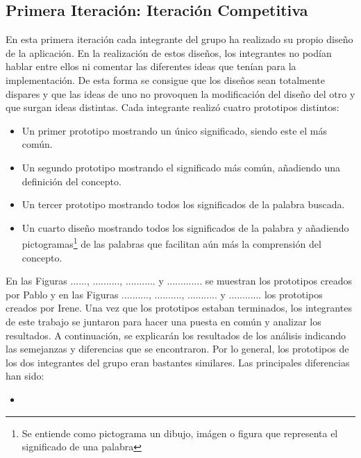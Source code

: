\subsection{Primera Iteración: Iteración Competitiva}
\label{cap:subsec:iteracionCompetitiva}

En esta primera iteración cada integrante del grupo ha realizado su propio diseño de la aplicación. En la realización de estos diseños, los integrantes no podían hablar entre ellos ni comentar las diferentes ideas que tenían para la implementación. De esta forma se consigue que los diseños sean totalmente dispares y que las ideas de uno no provoquen la modificación del diseño del otro y que surgan ideas distintas.
Cada integrante realizó cuatro prototipos distintos:
\begin{itemize}
	\item Un primer prototipo mostrando un único significado, siendo este el más común.
	\item Un segundo prototipo mostrando el significado más común, añadiendo una definición del concepto.
	\item Un tercer prototipo mostrando todos los significados de la palabra buscada.
	\item Un cuarto diseño mostrando todos los significados de la palabra y añadiendo pictogramas\footnote{Se entiende como pictograma un dibujo, imágen o figura que representa el significado de una palabra} de las palabras que facilitan aún más la comprensión del concepto.
	
\end{itemize}

En las Figuras ......, .........., ........... y ............. se muestran los prototipos creados por Pablo y en las Figuras .........., .........., ........... y ............ los prototipos creados por Irene.
Una vez que los prototipos estaban terminados, los integrantes de este trabajo se juntaron para hacer una puesta en común y analizar los resultados. A continuación, se explicarán los resultados de los análisis indicando las semejanzas y diferencias que se encontraron.
Por lo general, los prototipos de los dos integrantes del grupo eran bastantes similares. Las principales diferencias han sido:

\begin{itemize}
	\item 
\end{itemize}



